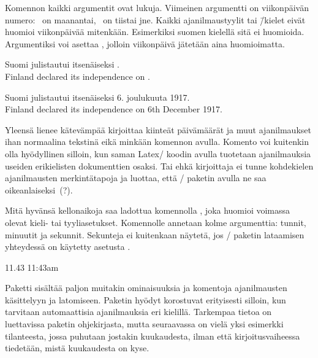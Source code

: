 \noindent
Komennon kaikki argumentit ovat lukuja. Viimeinen argumentti on
viikonpäivän numero: ~on maanantai, ~on tiistai jne.
Kaikki ajanilmaustyylit tai \=/kielet eivät huomioi viikonpäivää
mitenkään. Esimerkiksi suomen kielellä sitä ei huomioida. Argumentiksi
voi asettaa , jolloin viikonpäivä jätetään aina huomioimatta.

\begin{koodilohkosis}
 Suomi julistautui itsenäiseksi
. \\
 Finland declared its independence on
.
\end{koodilohkosis}

\begin{tulossis}
  Suomi julistautui itsenäiseksi 6. joulukuuta 1917. \\
  Finland declared its independence on 6th December 1917.
\end{tulossis}

\noindent
Yleensä lienee kätevämpää kirjoittaa kiinteät päivämäärät ja muut
ajanilmaukset ihan normaalina tekstinä eikä minkään komennon avulla.
Komento  voi kuitenkin olla hyödyllinen silloin,
kun saman Latex\-/ koodin avulla tuotetaan ajanilmauksia useiden
erikielisten dokumenttien osaksi. Tai ehkä kirjoittaja ei tunne
kohdekielen ajanilmausten merkintätapoja ja luottaa, että
\-/ paketin avulla ne saa oikeanlaiseksi~(?).

Mitä hyvänsä kellonaikoja saa ladottua komennolla
, joka huomioi voimassa olevat kieli- tai
tyyliasetukset. Komennolle annetaan kolme argumenttia: tunnit, minuutit
ja sekunnit. Sekunteja ei kuitenkaan näytetä, jos \-/
paketin lataamisen yhteydessä on käytetty asetusta
.

\begin{koodilohkosis}
 
   
\end{koodilohkosis}

\begin{tulossis}
   11.43 11:43am
\end{tulossis}

\noindent
Paketti  sisältää paljon muitakin ominaisuuksia ja
komentoja ajanilmausten käsittelyyn ja latomiseen. Paketin hyödyt
korostuvat erityisesti silloin, kun tarvitaan automaattisia
ajanilmauksia eri kielillä. Tarkempaa tietoa on luettavissa paketin
ohjekirjasta, mutta seuraavassa on vielä yksi esimerkki tilanteesta,
jossa puhutaan jostakin kuukaudesta, ilman että kirjoitusvaiheessa
tiedetään, mistä kuukaudesta on kyse.

